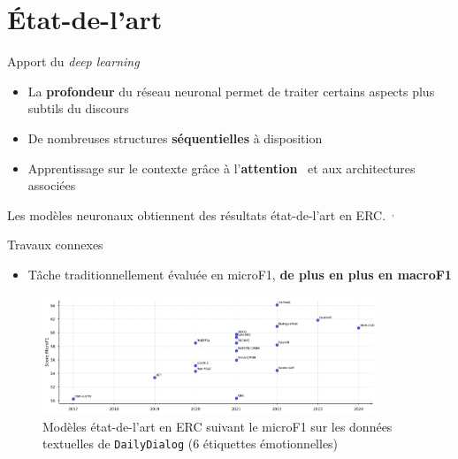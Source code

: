 \documentclass[11pt,aspectratio=169]{beamer}
\begin{document}
\section{État-de-l'art}

\begin{frame}{Apport du \textsl{deep learning}}
    \begin{itemize}
        \item La \textcolor{roose}{\bf profondeur} du réseau neuronal permet de traiter certains aspects plus subtils du discours %
        \item De nombreuses structures \textcolor{roose}{\bf séquentielles} à disposition
        \item Apprentissage sur le contexte grâce à l'\textcolor{roose}{\bf attention}~ et aux architectures associées~
    \end{itemize}
    \vspace*{10pt}

Les modèles neuronaux obtiennent des résultats état-de-l'art en ERC.~$^{,}$
\end{frame}

\begin{frame}{Travaux connexes}
    \begin{itemize}
        \item Tâche traditionnellement évaluée en microF1, \textcolor{roose}{\bf de plus en plus en macroF1}
    \end{itemize}
    \begin{figure}
        \centering
        \includegraphics[width=0.9\textwidth]{sota-chrono-plot.png}
        \caption{\centering Modèles état-de-l'art en ERC suivant le microF1 sur les données textuelles de \texttt{DailyDialog} (6 étiquettes émotionnelles)}
    \end{figure}
\end{frame}
\end{document}
